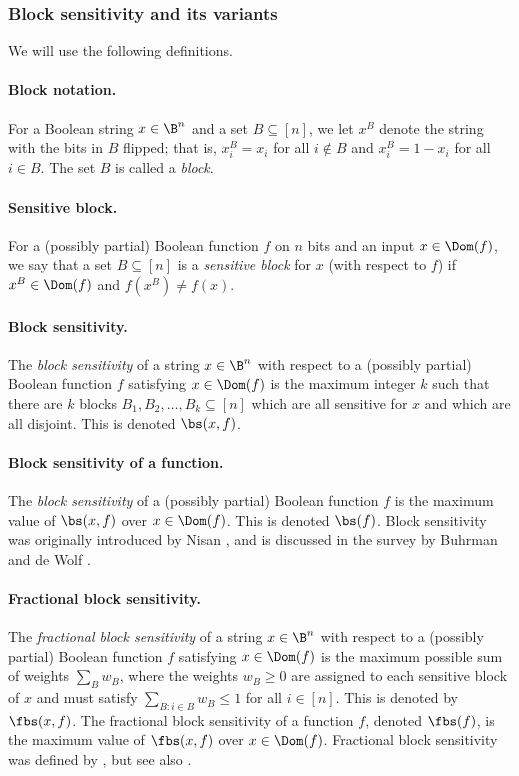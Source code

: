 \subsubsection{Block sensitivity and its variants}

We will use the following definitions.

\paragraph{Block notation.} For a Boolean string $x\in\B^n$
and a set $B\subseteq[n]$, we let $x^B$ denote the
string with the bits in $B$ flipped; that is,
$x^B_i=x_i$ for all $i\notin B$ and $x^B_i=1-x_i$ for all $i\in B$.
The set $B$ is called a \emph{block}.

\paragraph{Sensitive block.} For a (possibly partial) Boolean
function $f$ on $n$ bits and an input $x\in\Dom(f)$, we say that
a set $B\subseteq[n]$ is a \emph{sensitive block} for $x$
(with respect to $f$) if $x^B\in\Dom(f)$ and $f(x^B)\ne f(x)$.

\paragraph{Block sensitivity.} The \emph{block sensitivity}
of a string $x\in\B^n$ with respect to a (possibly partial)
Boolean function $f$ satisfying $x\in\Dom(f)$ is the maximum
integer $k$ such that there are $k$ blocks
$B_1,B_2,\dots,B_k\subseteq[n]$ which are all sensitive
for $x$ and which are all disjoint. This is denoted
$\bs(x,f)$.

\paragraph{Block sensitivity of a function.} The
\emph{block sensitivity} of a (possibly partial) Boolean function
$f$ is the maximum value of $\bs(x,f)$ over $x\in\Dom(f)$.
This is denoted $\bs(f)$.
Block sensitivity was originally introduced by Nisan
\cite{Nis91}, and is discussed in the survey by Buhrman and
de Wolf \cite{BdW02}.

\paragraph{Fractional block sensitivity.} The
\emph{fractional block sensitivity} of a string $x\in\B^n$
with respect to a (possibly partial) Boolean function $f$
satisfying $x\in\Dom(f)$ is the maximum possible
sum of weights $\sum_B w_B$, where the weights $w_B\ge 0$
are assigned to each sensitive block of $x$ and must satisfy
$\sum_{B:i\in B} w_B\le 1$ for all $i\in[n]$.
This is denoted by $\fbs(x,f)$. The fractional block sensitivity
of a function $f$, denoted $\fbs(f)$, is the maximum value of
$\fbs(x,f)$ over $x\in\Dom(f)$.
Fractional block sensitivity was defined by \cite{Aar08},
but see also \cite{KT16}.


